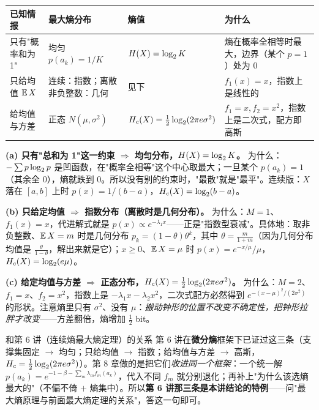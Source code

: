 \begin{center}\small
\begin{tabular}{>{\raggedright\arraybackslash}p{}>{\raggedright\arraybackslash}p{}>{\raggedright\arraybackslash}p{}>{\raggedright\arraybackslash}p{}}
\toprule
已知情报 & 最大熵分布 & 熵值 & 为什么 \\
\midrule
只有"概率和为 1" & 均匀 $p(a_k)=1/K$ & $H\!\left(X\right)=\log_{2} K$ &
熵在概率全相等时最大，边界（某个 $p=1$）处为 $0$ \\
只给均值 $\operatorname{\mathbb{E}} X$ & 连续：指数；离散非负整数：几何 & 见下 &
$f_1(x)=x$，指数上是线性的 \\
给均值与方差 & 正态 $N(\mu,\sigma^2)$ & $H_{c}\!\left(X\right)=\tfrac12\log_{2}(2\pi e\sigma^2)$ &
$f_1=x,f_2=x^2$，指数上是二次式，配方即高斯 \\
\bottomrule
\end{tabular}
\end{center}

\textbf{(a) 只有"总和为 1"这一约束 $\Rightarrow$ 均匀分布，$H\!\left(X\right)=\log_{2} K$。}
为什么：$-\sum p\log_{2} p$ 是凹函数，在"概率全相等"这个中心取最大；一旦某个 $p(a_k)=1$（其余全 $0$），熵就跌到 $0$。所以没有别的约束时，"最散"就是"最平"。连续版：$X$ 落在 $[a,b]$ 上时 $p(x)=1/(b-a)$，$H_{c}\!\left(X\right)=\log_{2}(b-a)$。

\textbf{(b) 只给定均值 $\Rightarrow$ 指数分布（离散时是几何分布）。}
为什么：$M=1$、$f_1(x)=x$，代进解式就是 $p(x)\propto e^{-\lambda_1x}$——正是"指数型衰减"。具体地：取非负整数、$\operatorname{\mathbb{E}} X=m$ 时是几何分布 $p_k=(1-\theta)\theta^k$，其中 $\theta=\frac{m}{1+m}$（因为几何分布均值是 $\frac{\theta}{1-\theta}$，解出来就是它）；$x\ge0$、$\operatorname{\mathbb{E}} X=\mu$ 时 $p(x)=e^{-x/\mu}/\mu$，$H_{c}\!\left(X\right)=\log_2(e\mu)$。

\textbf{(c) 给定均值与方差 $\Rightarrow$ 正态分布，$H_{c}\!\left(X\right)=\frac12\log_{2}(2\pi e\sigma^2)$。}
为什么：$M=2$、$f_1=x$、$f_2=x^2$，指数上是 $-\lambda_1x-\lambda_2x^2$，二次式配方必然得到 $e^{-(x-\mu)^2/(2\sigma^2)}$ 的形状。注意熵里只有 $\sigma^2$、没有 $\mu$：\emph{搬动钟形的位置不改变不确定性，把钟形拉胖才改变}——方差翻倍，熵增加 $\tfrac12$ bit。

\begin{idea}{和第 6 讲（连续熵最大熵定理）的关系}
第 6 讲在\textbf{微分熵}框架下已证过这三条（支撑集固定 $\to$ 均匀；只给均值 $\to$ 指数；给均值与方差 $\to$ 高斯，$H_c=\frac12\log_{2}(2\pi e\sigma^2)$）。第 8 章做的是把它们\emph{收进同一个框架}：一个统一解 $p(a_k)=e^{-1-\beta-\sum_m\lambda_mf_m(a_k)}$，代入不同 $f_m$ 就分别退化；再补上"为什么该选熵最大的"（不偏不倚 $+$ 熵集中）。所以\textbf{第 6 讲那三条是本讲结论的特例}——问"最大熵原理与前面最大熵定理的关系"，答这一句即可。
\end{idea}

